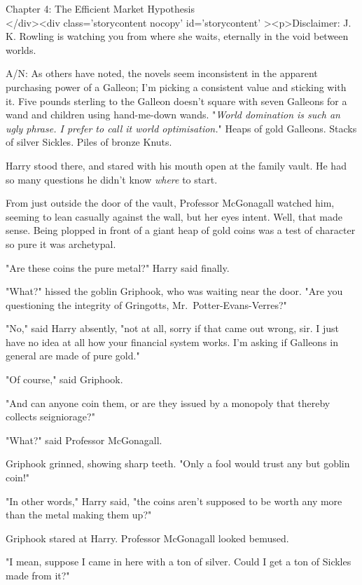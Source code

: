 
Chapter 4: The Efficient Market Hypothesis\\
</div><div  class='storycontent nocopy' id='storycontent' ><p>Disclaimer: J. K. 
Rowling is watching you from where she waits, eternally in the void between 
worlds.

A/N: As others have noted, the novels seem inconsistent in the apparent 
purchasing power of a Galleon; I'm picking a consistent value and sticking with 
it. Five pounds sterling to the Galleon doesn't square with seven Galleons for 
a wand and children using hand-me-down wands.
\sbreak
"\emph{World domination is such an ugly phrase. I prefer to call it world 
optimisation.}"
\sbreak
Heaps of gold Galleons. Stacks of silver Sickles. Piles of bronze Knuts.

Harry stood there, and stared with his mouth open at the family vault. He had 
so many questions he didn't know \emph{where} to start.

From just outside the door of the vault, Professor McGonagall watched him, 
seeming to lean casually against the wall, but her eyes intent. Well, that made 
sense. Being plopped in front of a giant heap of gold coins was a test of 
character so pure it was archetypal.

"Are these coins the pure metal?" Harry said finally.

"What?" hissed the goblin Griphook, who was waiting near the door. "Are you 
questioning the integrity of Gringotts, Mr.~Potter-Evans-Verres?"

"No," said Harry absently, "not at all, sorry if that came out wrong, sir. I 
just have no idea at all how your financial system works. I'm asking if 
Galleons in general are made of pure gold."

"Of course," said Griphook.

"And can anyone coin them, or are they issued by a monopoly that thereby 
collects seigniorage?"

"What?" said Professor McGonagall.

Griphook grinned, showing sharp teeth. "Only a fool would trust any but goblin 
coin!"

"In other words," Harry said, "the coins aren't supposed to be worth any more 
than the metal making them up?"

Griphook stared at Harry. Professor McGonagall looked bemused.

"I mean, suppose I came in here with a ton of silver. Could I get a ton of 
Sickles made from it?"

